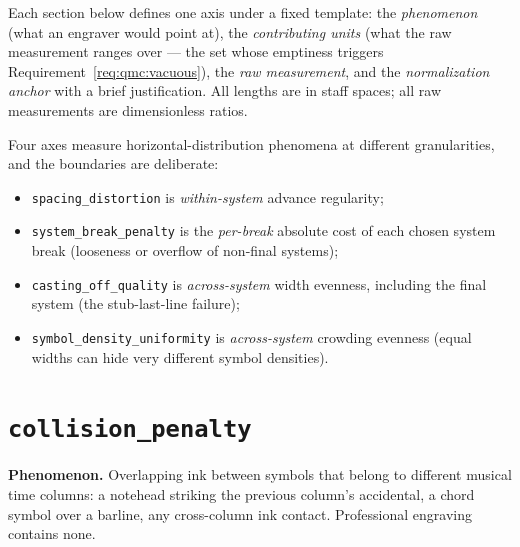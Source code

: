 \documentclass[11pt,letterpaper]{report}
\begin{document}
Each section below defines one axis under a fixed template: the
\emph{phenomenon} (what an engraver would point at), the \emph{contributing
units} (what the raw measurement ranges over --- the set whose emptiness
triggers Requirement~\ref{req:qmc:vacuous}), the \emph{raw measurement},
and the \emph{normalization anchor} with a brief justification. All
lengths are in staff spaces; all raw measurements are dimensionless
ratios.

Four axes measure horizontal-distribution phenomena at different
granularities, and the boundaries are deliberate:

\begin{itemize}
  \item \texttt{spacing\_distortion} is \emph{within-system} advance
    regularity;
  \item \texttt{system\_break\_penalty} is the \emph{per-break} absolute
    cost of each chosen system break (looseness or overflow of
    non-final systems);
  \item \texttt{casting\_off\_quality} is \emph{across-system} width
    evenness, including the final system (the stub-last-line failure);
  \item \texttt{symbol\_density\_uniformity} is \emph{across-system}
    crowding evenness (equal widths can hide very different symbol
    densities).
\end{itemize}

\section{\texttt{collision\_penalty}}
\label{sec:metrics:collision}

\textbf{Phenomenon.} Overlapping ink between symbols that belong to
different musical time columns: a notehead striking the previous column's
accidental, a chord symbol over a barline, any cross-column ink contact.
Professional engraving contains none.
\end{document}

